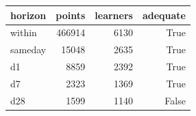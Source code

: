 \begin{tabular}{lrrr}
\toprule
horizon & points & learners & adequate \\
\midrule
within & 466914 & 6130 & True \\
sameday & 15048 & 2635 & True \\
d1 & 8859 & 2392 & True \\
d7 & 2323 & 1369 & True \\
d28 & 1599 & 1140 & False \\
\bottomrule
\end{tabular}

